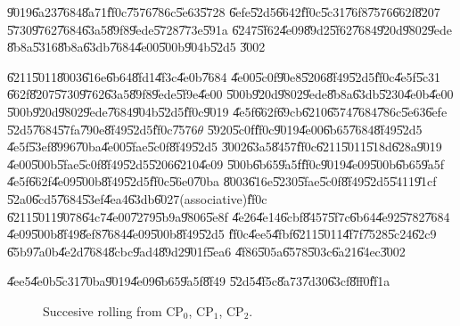 \documentclass{article}
\begin{document}
\U{9019}\U{6a23}\U{7684}\U{8a71}\U{ff0c}\U{7576}\U{786c}\U{5e63}\U{5728}%
\U{6efe}\U{52d5}\U{6642}\U{ff0c}\U{5c31}\U{76f8}\U{7576}\U{662f}\U{8207}%
\U{5730}\U{9762}\U{7684}\U{63a5}\U{89f8}\U{9ede}\U{5728}\U{773e}\U{591a}%
\U{6247}\U{5f62}\U{4e09}\U{89d2}\U{5f62}\U{7684}\U{920d}\U{9802}\U{9ede}%
\U{8b8a}\U{5316}\U{8b8a}\U{63db}\U{7684}\U{4e00}\U{500b}\U{904b}\U{52d5}%
\U{3002}

\U{6211}\U{5011}\U{8003}\U{616e}\U{6b64}\U{8fd1}\U{4f3c}\U{4e0b}\U{7684}%
\U{4e00}\U{5c0f}\U{90e8}\U{5206}\U{8f49}\U{52d5}\U{ff0c}\U{4e5f}\U{5c31}%
\U{662f}\U{8207}\U{5730}\U{9762}\U{63a5}\U{89f8}\U{9ede}\U{5f9e}\U{4e00}%
\U{500b}\U{920d}\U{9802}\U{9ede}\U{8b8a}\U{63db}\U{5230}\U{4e0b}\U{4e00}%
\U{500b}\U{920d}\U{9802}\U{9ede}\U{7684}\U{904b}\U{52d5}\U{ff0c}\U{9019}%
\U{4e5f}\U{662f}\U{69cb}\U{6210}\U{6574}\U{7684}\U{786c}\U{5e63}\U{6efe}%
\U{52d5}\U{7684}\U{57fa}\U{790e}\U{8f49}\U{52d5}\U{ff0c}\U{7576}$\theta $%
\U{5920}\U{5c0f}\U{ff0c}\U{9019}\U{4e00}\U{6b65}\U{7684}\U{8f49}\U{52d5}%
\U{4e5f}\U{53ef}\U{8996}\U{70ba}\U{4e00}\U{5fae}\U{5c0f}\U{8f49}\U{52d5}%
\U{3002}\U{63a5}\U{8457}\U{ff0c}\U{6211}\U{5011}\U{518d}\U{628a}\U{9019}%
\U{4e00}\U{500b}\U{5fae}\U{5c0f}\U{8f49}\U{52d5}\U{5206}\U{6210}\U{4e09}%
\U{500b}\U{6b65}\U{9a5f}\U{ff0c}\U{9019}\U{4e09}\U{500b}\U{6b65}\U{9a5f}%
\U{4e5f}\U{662f}\U{4e09}\U{500b}\U{8f49}\U{52d5}\U{ff0c}\U{56e0}\U{70ba}%
\U{8003}\U{616e}\U{5230}\U{5fae}\U{5c0f}\U{8f49}\U{52d5}\U{5411}\U{91cf}%
\U{52a0}\U{6cd5}\U{7684}\U{53ef}\U{4ea4}\U{63db}\U{6027}(associative)\U{ff0c}%
\U{6211}\U{5011}\U{9078}\U{64c7}\U{4e00}\U{7279}\U{5b9a}\U{9806}\U{5e8f}%
\U{4e26}\U{4e14}\U{6cbf}\U{8457}\U{5f7c}\U{6b64}\U{4e92}\U{5782}\U{7684}%
\U{4e09}\U{500b}\U{8f49}\U{8ef8}\U{7684}\U{4e09}\U{500b}\U{8f49}\U{52d5}%
\U{ff0c}\U{4ee5}\U{4fbf}\U{6211}\U{5011}\U{4f7f}\U{7528}\U{5c24}\U{62c9}%
\U{65b9}\U{7a0b}\U{4e2d}\U{7684}\U{8cbc}\U{9ad4}\U{89d2}\U{901f}\U{5ea6}%
\U{4f86}\U{505a}\U{6578}\U{503c}\U{6a21}\U{64ec}\U{3002}

\U{4ee5}\U{4e0b}\U{5c31}\U{70ba}\U{9019}\U{4e09}\U{6b65}\U{9a5f}\U{8f49}%
\U{52d5}\U{4f5c}\U{8a73}\U{7d30}\U{63cf}\U{8ff0}\U{ff1a}

\begin{figure}[th]
\caption{{}}
\label{figure1}
\begin{center}
\fbox{}
\end{center}
\end{figure}

\begin{figure}[th]
\caption{{}Succesive rolling from CP$_{0}$, CP$_{1}$, CP$_{2}$.}
\begin{center}
\fbox{}
\end{center}
\end{figure}
\end{document}
